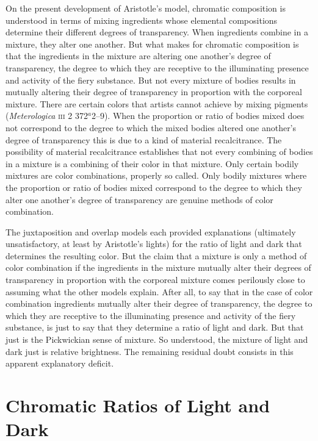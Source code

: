 On the present development of Aristotle's model, chromatic composition is understood in terms of mixing ingredients whose elemental compositions determine their different degrees of transparency. When ingredients combine in a mixture, they alter one another. But what makes for chromatic composition is that the ingredients in the mixture are altering one another's degree of transparency, the degree to which they are receptive to the illuminating presence and activity of the fiery substance. But not every mixture of bodies results in mutually altering their degree of transparency in proportion with the corporeal mixture. There are certain colors that artists cannot achieve by mixing pigments (\emph{Meterologica} \textsc{iii} 2 372\( ^{a} \)2--9). When the proportion or ratio of bodies mixed does not correspond to the degree to which the mixed bodies altered one another's degree of transparency this is due to a kind of material recalcitrance. The possibility of material recalcitrance establishes that not every combining of bodies in a mixture is a combining of their color in that mixture. Only certain bodily mixtures are color combinations, properly so called. Only bodily mixtures where the proportion or ratio of bodies mixed correspond to the degree to which they alter one another's degree of transparency are genuine methods of color combination.

The juxtaposition and overlap models each provided explanations (ultimately unsatisfactory, at least by Aristotle's lights) for the ratio of light and dark that determines the resulting color. But the claim that a mixture is only a method of color combination if the ingredients in the mixture mutually alter their degrees of transparency in proportion with the corporeal mixture comes perilously close to assuming what the other models explain. After all, to say that in the case of color combination ingredients mutually alter their degree of transparency, the degree to which they are receptive to the illuminating presence and activity of the fiery substance, is just to say that they determine a ratio of light and dark. But that just is the Pickwickian sense of mixture. So understood, the mixture of light and dark just is relative brightness. The remaining residual doubt consists in this apparent explanatory deficit. 




\section{Chromatic Ratios of Light and Dark} %
\label{sec:chromatic_ratios_of_light_and_dark}

